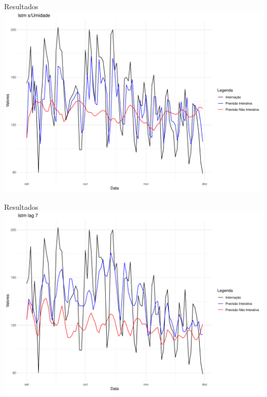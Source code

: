 \documentclass[
  ignorenonframetext,
]{beamer}
\begin{document}
\begin{frame}{Resultados}
\label{resultados-5}
\includegraphics[width=1\textwidth,height=\textheight]{apresentacao_files/figure-beamer/unnamed-chunk-14-1.pdf}
\end{frame}

\begin{frame}{Resultados}
\label{resultados-6}
\includegraphics[width=1\textwidth,height=\textheight]{apresentacao_files/figure-beamer/unnamed-chunk-15-1.pdf}
\end{frame}
\end{document}

